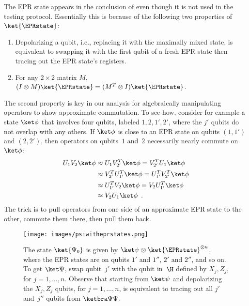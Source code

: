 \documentclass[11pt]{article}
\begin{document}
The EPR state appears in the conclusion of  even though it is not used in the testing protocol.  Essentially this is because of the following two properties of $\ket{\EPRstate}$: 
\begin{enumerate}
\item Depolarizing a qubit, i.e., replacing it with the maximally mixed state, is equivalent to swapping it with the first qubit of a fresh EPR state then tracing out the EPR state's registers.  
\item For any $2 \times 2$ matrix $M$, $(I \otimes M) \ket{\EPRstate} = (M^T \otimes I) \ket{\EPRstate}$.  
\end{enumerate}
The second property is key in our analysis for algebraically manipulating operators to show approximate commutation.  To see how, consider for example a state $\ket \phi$ that involves four qubits, labeled $1, 2, 1', 2'$, where the $j'$ qubits do not overlap with any others.  If $\ket \phi$ is close to an EPR state on qubits $(1,1')$ and $(2,2')$, then operators on qubits~$1$ and~$2$ necessarily nearly commute on~$\ket \phi$: 
\begin{align*}
U_1 V_2 \ket \phi
&\approx U_1 V_{2'}^T \ket \phi 
= V_{2'}^T U_1 \ket \phi \\
&\approx V_{2'}^T U_{1'}^T \ket \phi 
= U_{1'}^T V_{2'}^T \ket \phi \\
&\approx U_{1'}^T V_2 \ket \phi 
= V_2 U_{1'}^T \ket \phi \\
&\approx V_2 U_1 \ket \phi
 \enspace .
\end{align*}
The trick is to pull operators from one side of an approximate EPR state to the other, commute them there, then pull them back.  

\begin{figure}
\centering
\texttt{[image: images/psiwitheprstates.png]}
\caption{The state $\ket{\Psi_0}$ is given by $\ket \psi \otimes \ket{\EPRstate}^{\otimes n}$, where the EPR states are on qubits $1'$ and $1''$, $2'$ and $2''$, and so on.  To get $\ket \Psi$, swap qubit~$j'$ with the qubit in~$\H$ defined by $X_j, Z_j$, for $j = 1, \ldots, n$.  Observe that starting from $\ket \psi$ and depolarizing the $X_j, Z_j$ qubits, for $j = 1, \ldots, n$, is equivalent to tracing out all $j'$ and~$j''$ qubits from $\ketbra \Psi \Psi$.} \label{f:addneprstates}
\end{figure}
\end{document}
